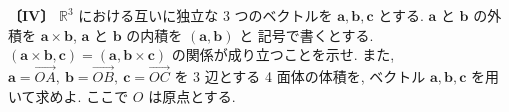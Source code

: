 \noindent\textbf{〔IV〕}
$\mathbb{R}^3$ における互いに独立な 3 つのベクトルを $\bm{a},\bm{b},\bm{c}$ とする.
$\bm{a}$ と $\bm{b}$ の外積を $\bm{a}\times\bm{b}$, $\bm{a}$ と $\bm{b}$ の内積を $(\bm{a},\bm{b})$ と
記号で書くとする. $(\bm{a}\times\bm{b},\bm{c})=(\bm{a},\bm{b}\times\bm{c})$ の関係が成り立つことを示せ.
また, $\bm{a}=\overrightarrow{OA},\ \bm{b}=\overrightarrow{OB},\ \bm{c}=\overrightarrow{OC}$ を
3 辺とする 4 面体の体積を, ベクトル $\bm{a},\bm{b},\bm{c}$ を用いて求めよ. ここで $O$ は原点とする.
